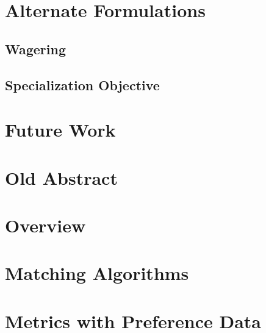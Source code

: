 \documentclass{article}
\begin{document}
\section{Alternate Formulations}

\subsection{Wagering}

\subsection{Specialization Objective}

\section{Future Work}

\newpage

\appendix
\appendixpage
\addappheadtotoc

\section{Old Abstract}



\section{Overview}



\section{Matching Algorithms}
\label{Matching}







\section{Metrics with Preference Data}
\label{Metrics}








\end{document}
